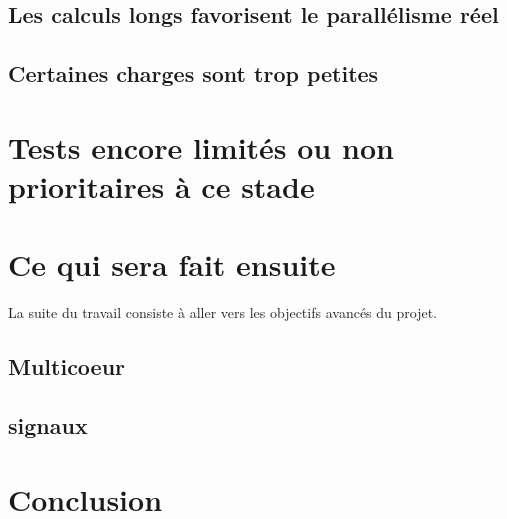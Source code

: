 \documentclass[11pt,a4paper]{article}
\begin{document}
\subsection{Les calculs longs favorisent le parall\'elisme r\'eel}


\subsection{Certaines charges sont trop petites}


\section{Tests encore limit\'es ou non prioritaires \`a ce stade}

\section{Ce qui sera fait ensuite}

La suite du travail consiste \`a aller vers les objectifs avanc\'es du projet.

\subsection{Multicoeur}

\subsection{signaux}

\section{Conclusion}
\end{document}
